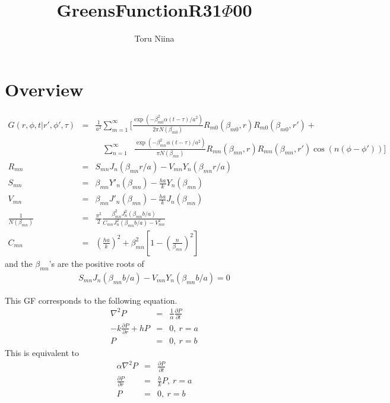 \documentclass{article}
\begin{document}
\title{GreensFunctionR31$\Phi$00}
\author{Toru Niina}
\maketitle

\section{Overview}

\begin{eqnarray}
    G(r, \phi, t | r', \phi', \tau) &=&
    \frac{1}{a^2} \sum_{m=1}^{\infty} \Bigg[
    \frac{\exp(-\beta_{m0}^2\alpha(t-\tau)/a^2)}{2\pi N(\beta_{m0})}
    R_{m0}(\beta_{m0}, r) R_{m0}(\beta_{m0}, r') +
\nonumber\\
    & &\ \ \ \ \sum_{n=1}^{\infty}\ \ \ 
    \frac{\exp(-\beta_{mn}^2\alpha(t-\tau)/a^2)}{\pi N(\beta_{mn})}
    R_{mn}(\beta_{mn}, r) R_{mn}(\beta_{mn}, r')\cos(n(\phi - \phi'))\Bigg]
\\
    R_{mn} &=& S_{mn}J_n(\beta_{mn}r/a) - V_{mn}Y_n(\beta_{mn}r/a)
\\
    S_{mn} &=& \beta_{mn}Y'_n(\beta_{mn}) - \frac{ha}{k}Y_n(\beta_{mn})
\\
    V_{mn} &=& \beta_{mn}J'_n(\beta_{mn}) - \frac{ha}{k}J_n(\beta_{mn})
\\
    \frac{1}{N(\beta_{mn})} &=&
        \frac{\pi^2}{2} \frac{\beta_{mn}^2 J_n^2(\beta_{mn}b/a)}
        {C_{mn}J_n^2(\beta_{mn}b/a) - V_{mn}^2}
\\
    C_{mn} &=& \left(\frac{ha}{k}\right)^2 + \beta_{mn}^2\left[1 - \left(\frac{n}{\beta_{mn}}\right)^2\right]
\end{eqnarray}
and the $\beta_{mn}$'s are the positive roots of
\begin{eqnarray}
    S_{mn}J_n(\beta_{mn}b/a) - V_{mn}Y_n(\beta_{mn}b/a) = 0
\end{eqnarray}


This GF corresponds to the following equation.
\begin{eqnarray}
    \nabla^2 P &=& \frac{1}{\alpha}\frac{\partial P}{\partial t}
\\
    -k\frac{\partial P}{\partial r} + hP &=& 0,\ r = a
\\
    P &=& 0,\ r = b
\end{eqnarray}
This is equivalent to
\begin{eqnarray}
    \alpha\nabla^2 P &=& \frac{\partial P}{\partial t}     \\
    \frac{\partial P}{\partial r} &=& \frac{h}{k}P,\ r = a \\
    P &=& 0,\ r = b
\end{eqnarray}
\end{document}

